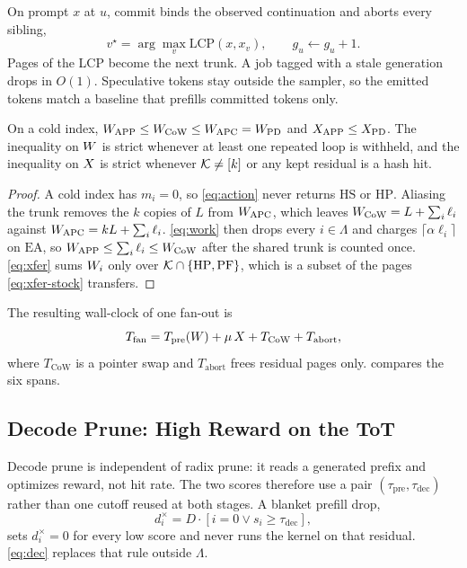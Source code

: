 On prompt $x$ at $u$, commit binds the observed continuation and aborts every sibling,
\begin{equation}
\label{eq:lcp}
v^\star=\arg\max_{v}\mathrm{LCP}(x,x_v),\qquad g_u\leftarrow g_u+1.
\end{equation}
Pages of the LCP become the next trunk.
A job tagged with a stale generation drops in $O(1)$.
Speculative tokens stay outside the sampler, so the emitted tokens match a baseline that prefills committed tokens only.

\begin{lemma}
\label{lem:dom}
On a cold index, $W_{\mathrm{APP}}\le W_{\mathrm{CoW}}\le W_{\mathrm{APC}}=W_{\mathrm{PD}}$ and $X_{\mathrm{APP}}\le X_{\mathrm{PD}}$.
The inequality on $W$ is strict whenever at least one repeated loop is withheld, and the inequality on $X$ is strict whenever $\mathcal{K}\neq[k]$ or any kept residual is a hash hit.
\end{lemma}

\begin{proof}
A cold index has $m_i{=}0$, so \eqref{eq:action} never returns $\mathrm{HS}$ or $\mathrm{HP}$.
Aliasing the trunk removes the $k$ copies of $L$ from $W_{\mathrm{APC}}$, which leaves $W_{\mathrm{CoW}}=L+\sum_i\ell_i$ against $W_{\mathrm{APC}}=kL+\sum_i\ell_i$.
\eqref{eq:work} then drops every $i\in\Lambda$ and charges $\lceil\alpha\ell_i\rceil$ on $\mathrm{EA}$, so $W_{\mathrm{APP}}\le\sum_i\ell_i\le W_{\mathrm{CoW}}$ after the shared trunk is counted once.
\eqref{eq:xfer} sums $W_i$ only over $\mathcal{K}\cap\{\mathrm{HP},\mathrm{PF}\}$, which is a subset of the pages \eqref{eq:xfer-stock} transfers.
\end{proof}

The resulting wall-clock of one fan-out is
\begin{equation}
\label{eq:tfan}
T_{\mathrm{fan}}=T_{\mathrm{pre}}(W)+\mu\,X+T_{\mathrm{CoW}}+T_{\mathrm{abort}},
\end{equation}
where $T_{\mathrm{CoW}}$ is a pointer swap and $T_{\mathrm{abort}}$ frees residual pages only.
 compares the six spans.

\subsection{Decode Prune: High Reward on the ToT}
\label{sec:split}

Decode prune is independent of radix prune: it reads a generated prefix and optimizes reward, not hit rate.
The two scores therefore use a pair $(\tau_{\mathrm{pre}},\tau_{\mathrm{dec}})$ rather than one cutoff reused at both stages.
A blanket prefill drop,
\begin{equation}
\label{eq:drej}
d_i^{\times}=D\cdot[i=0\lor s_i\ge\tau_{\mathrm{dec}}],
\end{equation}
sets $d_i^{\times}{=}0$ for every low score and never runs the kernel on that residual.
\eqref{eq:dec} replaces that rule outside $\Lambda$.

